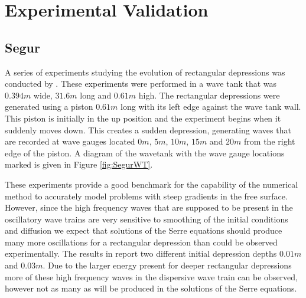 
\chapter{Experimental Validation}
\label{chp:ExpMethodComp}




\section{Segur}




A series of experiments studying the evolution of rectangular depressions was conducted by \citet{Hammack-Segur-1978-337}. These experiments were performed in a wave tank that was $0.394m$ wide, $31.6m$ long and $0.61m$ high. The rectangular depressions were generated using a piston $0.61m$ long with its left edge against the wave tank wall. This piston is initially in the up position and the experiment begins when it suddenly moves down. This creates a sudden depression, generating waves that are recorded at wave gauges located $0m$, $5m$, $10m$, $15m$ and $20m$ from the right edge of the piston. A diagram of the wavetank with the wave gauge locations marked is given in Figure \ref{fig:SegurWT}. 

These experiments provide a good benchmark for the capability of the numerical method to accurately model problems with steep gradients in the free surface. However, since the high frequency waves that are supposed to be present in the oscillatory wave trains are very sensitive to smoothing of the initial conditions and diffusion \cite{Pitt-2018-61} we expect that solutions of the Serre equations should produce many more oscillations for a rectangular depression than could be observed experimentally. The results in \citet{Hammack-Segur-1978-337} report two different initial depression depths $0.01m$ and $0.03m$. Due to the larger energy present for deeper rectangular depressions more of these high frequency waves in the dispersive wave train can be observed, however not as many as will be produced in the solutions of the Serre equations. 

